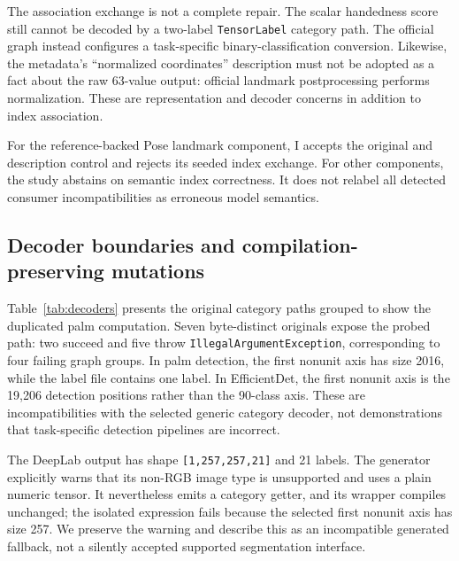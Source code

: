 \documentclass[10pt,twocolumn,letterpaper]{article}
\newcommand{\code}[1]{\texttt{#1}}
\begin{document}
The association exchange is not a complete repair. The scalar handedness score still cannot be decoded by a two-label \code{TensorLabel} category path. The official graph instead configures a task-specific binary-classification conversion. Likewise, the metadata's ``normalized coordinates'' description must not be adopted as a fact about the raw 63-value output: official landmark postprocessing performs normalization. These are representation and decoder concerns in addition to index association.

For the reference-backed Pose landmark component, I accepts the original and description control and rejects its seeded index exchange. For other components, the study abstains on semantic index correctness. It does not relabel all detected consumer incompatibilities as erroneous model semantics.

\subsection{Decoder boundaries and compilation-preserving mutations}
Table~\ref{tab:decoders} presents the original category paths grouped to show the duplicated palm computation. Seven byte-distinct originals expose the probed path: two succeed and five throw \code{IllegalArgumentException}, corresponding to four failing graph groups. In palm detection, the first nonunit axis has size 2016, while the label file contains one label. In EfficientDet, the first nonunit axis is the 19,206 detection positions rather than the 90-class axis. These are incompatibilities with the selected generic category decoder, not demonstrations that task-specific detection pipelines are incorrect.

\begin{table}[t]
\centering\small

\caption{Original decoder outcomes. The palm row covers two byte-distinct binaries with an identical canonical graph. The four other metadata-bearing components have no generated category getter and are outside D. $^*$DeepLab emits an existing non-RGB-image warning and falls back to a plain numeric tensor; its outcome must not be presented as absence of all tool diagnostics.}
\label{tab:decoders}
\end{table}

The DeepLab output has shape \code{[1,257,257,21]} and 21 labels. The generator explicitly warns that its non-RGB image type is unsupported and uses a plain numeric tensor. It nevertheless emits a category getter, and its wrapper compiles unchanged; the isolated expression fails because the selected first nonunit axis has size 257. We preserve the warning and describe this as an incompatible generated fallback, not a silently accepted supported segmentation interface.
\end{document}
